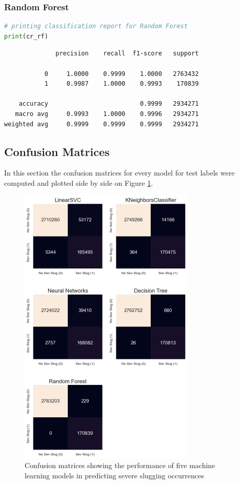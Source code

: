 \documentclass{article}
\begin{document}
\subsubsection{Random Forest}
\begin{lstlisting}[language=Python]
# printing classification report for Random Forest
print(cr_rf)
\end{lstlisting}
\begin{verbatim}   
              precision    recall  f1-score   support

           0     1.0000    0.9999    1.0000   2763432
           1     0.9987    1.0000    0.9993    170839

    accuracy                         0.9999   2934271
   macro avg     0.9993    1.0000    0.9996   2934271
weighted avg     0.9999    0.9999    0.9999   2934271
\end{verbatim}


\subsection{Confusion Matrices}
In this section the confusion matrices for every model for test labels were computed and plotted side by side on Figure \ref{fig:confusion_matrices}.

\begin{figure}
\centering
\includegraphics[width=0.75\textwidth]{confusion_matrices.png}
\caption{\label{fig:confusion_matrices}Confusion matrices showing the performance of five machine learning models in predicting severe slugging occurrences}
\end{figure}
\end{document}
